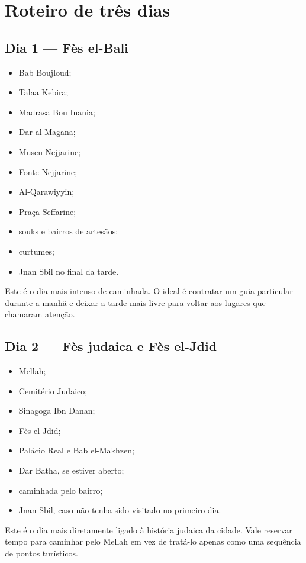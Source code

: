 \chapter{Roteiro de três dias}

\section*{Dia 1 — Fès el-Bali}

\begin{itemize}
\item Bab Boujloud;
\item Talaa Kebira;
\item Madrasa Bou Inania;
\item Dar al-Magana;
\item Museu Nejjarine;
\item Fonte Nejjarine;
\item Al-Qarawiyyin;
\item Praça Seffarine;
\item souks e bairros de artesãos;
\item curtumes;
\item Jnan Sbil no final da tarde.
\end{itemize}

Este é o dia mais intenso de caminhada. O ideal é contratar um guia particular durante a manhã e deixar a tarde mais livre para voltar aos lugares que chamaram atenção.

\section*{Dia 2 — Fès judaica e Fès el-Jdid}

\begin{itemize}
\item Mellah;
\item Cemitério Judaico;
\item Sinagoga Ibn Danan;
\item Fès el-Jdid;
\item Palácio Real e Bab el-Makhzen;
\item Dar Batha, se estiver aberto;
\item caminhada pelo bairro;
\item Jnan Sbil, caso não tenha sido visitado no primeiro dia.
\end{itemize}

Este é o dia mais diretamente ligado à história judaica da cidade. Vale reservar tempo para caminhar pelo Mellah em vez de tratá-lo apenas como uma sequência de pontos turísticos.

